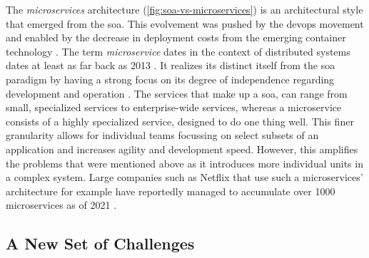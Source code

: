 The \textit{microservices} architecture (\cref{fig:soa-vs-microservices}) is an architectural style that emerged from the \gls{soa}. This evolvement was pushed by the  \gls{devops} movement and enabled by the decrease in deployment costs from the emerging \gls{container} technology \cite{amaral2015performance}.  The term \textit{microservice} dates in the context of distributed systems dates at least as far back as 2013 \cite{fowler-microservices}. It realizes its distinct itself from the \gls{soa}  paradigm by having a strong focus on its degree of independence regarding development and operation \cite{ibm-soa-vs-microservices}. The services that make up a \gls{soa}, can range from small, specialized services to enterprise-wide services, whereas a microservice consists of a highly specialized service, designed to do one thing well. This finer granularity allows for individual teams focussing on select subsets of an application and increases agility and development speed. However, this amplifies the problems that were mentioned above as it introduces more individual units in a complex system. Large companies such as Netflix that use such a microservices' architecture for example have reportedly managed to accumulate over 1000 microservices as of 2021 \cite{design-example-microservices, netflix-microservices-cost}.



\subsection{A New Set of Challenges}
\label{sec:background:soa:challenges}



